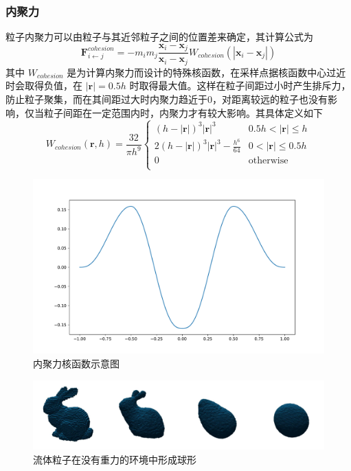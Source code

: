 \subsubsection{内聚力}
    粒子内聚力可以由粒子与其近邻粒子之间的位置差来确定，其计算公式为
    \begin{equation}
    	\mathbf F_{i \leftarrow j} ^{cohesion}
    	= - m_i m_j
    	\frac {\mathbf x_i - \mathbf x_j} {\mathbf x_i - \mathbf x_j}
    	W_{cohesion} (|\mathbf x_i - \mathbf x_j|)
    \end{equation}
    其中 $W_{cohesion}$ 是为计算内聚力而设计的特殊核函数，在采样点据核函数中心过近时会取得负值，在 $|\mathbf r| = 0.5h$ 时取得最大值。这样在粒子间距过小时产生排斥力，防止粒子聚集，而在其间距过大时内聚力趋近于0，对距离较远的粒子也没有影响，仅当粒子间距在一定范围内时，内聚力才有较大影响。其具体定义如下
    \begin{equation}
    	W_{cohesion}(\mathbf r, h) = \frac {32} {\pi h^9}
    	\left\{
    	\begin{array}{ll}
    
    	(h - |\mathbf r|)^3 |\mathbf r|^3 & 0.5h < |\mathbf r| \le h \\
    	2(h - |\mathbf r|)^3 |\mathbf r|^3 - \frac {h^6} {64} & 0 < |\mathbf r| \le 0.5h \\
    	0 & \mathrm{otherwise} \\
    
    	\end{array}
    	\right.
    \end{equation}
    
    \begin{figure}
    	\centering
    	\includegraphics[width=.85\textwidth]{figures/simulation/cohesion_kernel.pdf}
    	\caption{内聚力核函数示意图}
    \end{figure}
    
    \begin{figure}[bp]
    	\centering
    	\includegraphics[width=.99\textwidth]{figures/simulation/surface.pdf}
    	\caption{流体粒子在没有重力的环境中形成球形}
    	\label{fig:tensionsphere}
    \end{figure}

